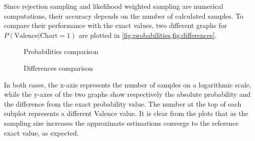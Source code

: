 \documentclass[a4paper, 12pt]{article}
\begin{document}
Since rejection sampling and likelihood weighted sampling are numerical computations, their accuracy depends on the number of calculated samples. To compare their performance with the exact values, two different graphs for $P\left(\mathrm{Valence} | \mathrm{Chart} = 1\right)$ are plotted in \cref{fig:probabilities,fig:differences}.

\begin{figure}
    \centering
    \caption{Probabilities comparison}
    \label{fig:probabilities}
\end{figure}

\begin{figure}
    \centering
    \caption{Differences comparison}
    \label{fig:differences}
\end{figure}

In both cases, the x-axis represents the number of samples on a logarithmic scale, while the y-axes of the two graphs show respectively the absolute probability and the difference from the exact probability value. The number at the top of each subplot represents a different Valence value. It is clear from the plots that as the sampling size increases the approximate estimations converge to the reference exact value, as expected.


\clearpage


\printbibliography[heading=bibintoc]
\end{document}
